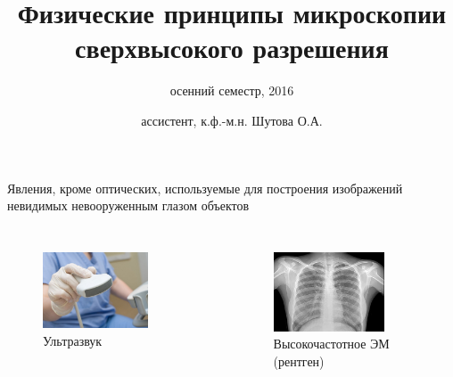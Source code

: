 \documentclass[9pt, compress, xcolor=table]{beamer}
\title{Физические принципы микроскопии сверхвысокого разрешения}
\subtitle{осенний семестр, 2016}
\author{ассистент, к.ф.-м.н. Шутова О.А.}
\institute{МГУ им. М.В. Ломоносова, физический факультет}
\begin{document}
\maketitle


\begin{frame}[fragile]
  \frametitle{}
  
Явления, кроме оптических, используемые для построения изображений невидимых невооруженным глазом объектов 
\begin{columns}[c]

\column{6cm}
\begin{figure}
\centering
\includegraphics[width=0.75\textwidth]{usi}
\\ \small{Ультразвук}
\end{figure}
\begin{figure}
\centering
\includegraphics[width=0.75\textwidth]{xray}
\\ \small{Высокочастотное ЭМ (рентген)}
\end{figure}

\column{6cm}


\end{columns}
\end{frame}
\end{document}
